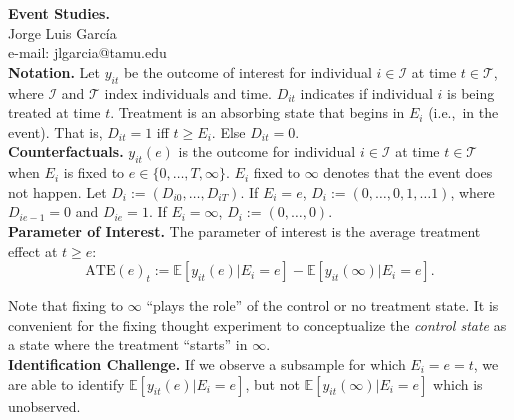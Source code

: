
\let\counterwithout\relax
\let\counterwithin\relax
{}



\noindent \textbf{Event Studies.}\\
\noindent Jorge Luis García \\
\noindent e-mail: jlgarcia@tamu.edu\\


\noindent \textbf{Notation.} Let $y_{it}$ be the outcome of interest for individual $i \in \mathcal{I}$ at time $t \in \mathcal{T}$, where $\mathcal{I}$ and  $\mathcal{T}$ index individuals and time. $D_{it}$ indicates if individual $i$ is being treated at time $t$. Treatment is an absorbing state that begins in $E_{i}$ (i.e.,\ in the event). That is, $D_{it} = 1$ iff $t \geq E_{i}$. Else $D_{it} = 0$.\\

\noindent \textbf{Counterfactuals.} $y_{it} \left( e \right)$ is the outcome for individual $i \in \mathcal{I}$ at time $t \in \mathcal{T}$ when $E_{i}$ is fixed to $e \in \{0, \ldots, T, \infty \}$. $E_{i}$ fixed to $\infty$ denotes that the event does not happen. Let $D_{i}:= \left( D_{i0}, \ldots, D_{iT} \right)$. If $E_{i} = e$, $D_{i}:= \left( 0, \ldots, 0, 1, \ldots 1 \right)$, where $D_{ie-1} = 0$ and $D_{ie} = 1$. If $E_{i} = \infty$, $D_{i}:= \left( 0, \ldots, 0 \right)$.\\

\noindent \textbf{Parameter of Interest.} The parameter of interest is the average treatment effect at $t \geq e$: 
\begin{equation}
\text{ATE} \left( e \right)_{t}:= \mathbb{E} \left[ y_{it} \left( e \right) | E_{i} = e \right] - \mathbb{E} \left[ y_{it} \left( \infty \right) | E_{i} = e \right]. \label{eq:atee}
\end{equation}

\noindent Note that fixing to $\infty$ ``plays the role'' of the control or no treatment state. It is convenient for the fixing thought experiment to conceptualize the \textit{control state} as a state where the treatment ``starts'' in $\infty$.\\

\noindent \textbf{Identification Challenge.} If we observe a subsample for which $E_{i} = e = t$, we are able to identify $\mathbb{E} \left[ y_{it} \left( e \right) | E_{i} = e \right]$, but not  $\mathbb{E} \left[ y_{it} \left( \infty \right) | E_{i} = e \right]$ which is unobserved.\\

